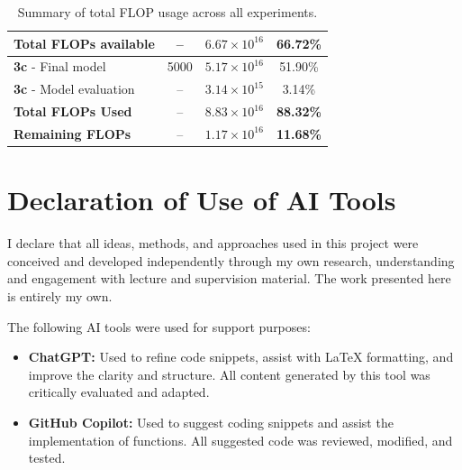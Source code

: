 \documentclass[a4paper,12pt]{article}
\begin{document}
\begin{table}[ht]
{\begin{tabular}{|l|c|c|c|}
  \hline
  \textbf{Total FLOPs available} & -- & $6.67 \times 10^{16}$ & \textbf{66.72\%} \\
  \hline
  \textbf{3c} - Final model & 5000 & $5.17 \times 10^{16}$ & 51.90\% \\
  \textbf{3c} - Model evaluation & -- & $3.14 \times 10^{15}$ & 3.14\% \\
  \hline
  \textbf{Total FLOPs Used} & -- & $8.83 \times 10^{16}$ & \textbf{88.32\%} \\
  \hline
  \textbf{Remaining FLOPs} & -- & $1.17 \times 10^{16}$ & \textbf{11.68\%} \\
  \hline
  \end{tabular}%
  }
  \vspace{0.2cm}
  \caption{Summary of total FLOP usage across all experiments.}
  \label{tab:flop-total}
  \end{table}
  




\section*{Declaration of Use of AI Tools}

I declare that all ideas, methods, and approaches used in this project were conceived and developed independently through my own research, understanding and engagement with lecture and supervision material. The work presented here is entirely my own.

The following AI tools were used for support purposes:
\begin{itemize}
    \item \textbf{ChatGPT:} Used to refine code snippets, assist with LaTeX formatting, and improve the clarity and structure. All content generated by this tool was critically evaluated and adapted.
    \item \textbf{GitHub Copilot:} Used to suggest coding snippets and assist the implementation of functions. All suggested code was reviewed, modified, and tested.
\end{itemize}
\end{document}
